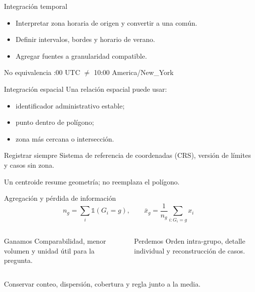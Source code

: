 \documentclass[aspectratio=169,11pt]{beamer}
\begin{document}
\begin{frame}{Integración temporal}
  \centering
  \vspace{.7em}
  \begin{itemize}
    \item Interpretar zona horaria de origen y convertir a una común.
    \item Definir intervalos, bordes y horario de verano.
    \item Agregar fuentes a granularidad compatible.
  \end{itemize}
  \begin{alertblock}{No equivalencia}
    :00 UTC $\neq$ 10:00 America/New\_York
  \end{alertblock}
\end{frame}

\begin{frame}{Integración espacial}
  Una relación espacial puede usar:
  \begin{itemize}
    \item identificador administrativo estable;
    \item punto dentro de polígono;
    \item zona más cercana o intersección.
  \end{itemize}
  \begin{block}{Registrar siempre}
    Sistema de referencia de coordenadas (CRS), versión de límites y casos sin zona.
  \end{block}
  \centering\alert{Un centroide resume geometría; no reemplaza el polígono.}
\end{frame}

\begin{frame}{Agregación y pérdida de información}
  \[
    n_g=\sum_i \mathbb{1}(G_i=g), \qquad
    \bar{x}_g=\frac{1}{n_g}\sum_{i:G_i=g}x_i
  \]
  \begin{columns}[T]
      \begin{block}{Ganamos}
        Comparabilidad, menor volumen y unidad útil para la pregunta.
      \end{block}
      \begin{block}{Perdemos}
        Orden intra-grupo, detalle individual y reconstrucción de casos.
      \end{block}
  \end{columns}
  \vfill
  \centering Conservar conteo, dispersión, cobertura y regla junto a la media.
\end{frame}
\end{document}
